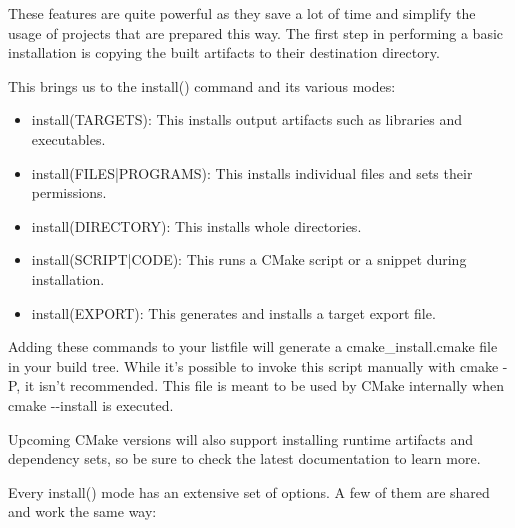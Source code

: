 These features are quite powerful as they save a lot of time and simplify the usage of projects that are prepared this way. The first step in performing a basic installation is copying the built artifacts to their destination directory.

This brings us to the install() command and its various modes:

\begin{itemize}
\item 
install(TARGETS): This installs output artifacts such as libraries and executables.

\item 
install(FILES|PROGRAMS): This installs individual files and sets their permissions.

\item 
install(DIRECTORY): This installs whole directories.

\item 
install(SCRIPT|CODE): This runs a CMake script or a snippet during installation.

\item 
install(EXPORT): This generates and installs a target export file.
\end{itemize}

Adding these commands to your listfile will generate a cmake\_install.cmake file in your build tree. While it's possible to invoke this script manually with cmake -P, it isn't recommended. This file is meant to be used by CMake internally when cmake -{}-install is executed.

\begin{tcolorbox}[colback=blue!5!white,colframe=blue!75!black,title=Note]
Upcoming CMake versions will also support installing runtime artifacts and dependency sets, so be sure to check the latest documentation to learn more.
\end{tcolorbox}

Every install() mode has an extensive set of options. A few of them are shared and work the same way:

